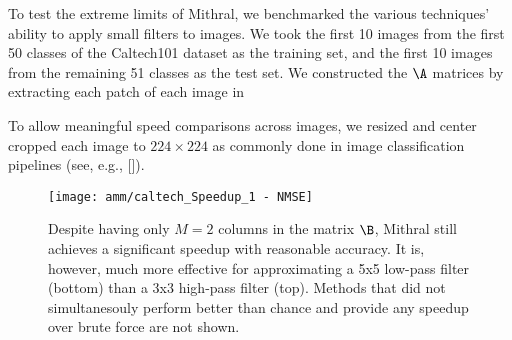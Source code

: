 To test the extreme limits of Mithral, we benchmarked the various techniques' ability to apply small filters to images. We took the first 10 images from the first 50 classes of the Caltech101 dataset as the training set, and the first 10 images from the remaining 51 classes as the test set. We constructed the $\A$ matrices by extracting each patch of each image in

To allow meaningful speed comparisons across images, we resized and center cropped each image to $224 \times 224$ as commonly done in image classification pipelines (see, e.g., []).



\begin{figure}[h]
\begin{center}
\texttt{[image: amm/caltech\_Speedup\_1 - NMSE]}
\caption{Despite having only $M=2$ columns in the matrix $\B$, Mithral still achieves a significant speedup with reasonable accuracy. It is, however, much more effective for approximating a 5x5 low-pass filter (bottom) than a 3x3 high-pass filter (top). Methods that did not simultanesouly perform better than chance and provide any speedup over brute force are not shown.}
\label{fig:caltech}
\end{center}
\end{figure}
